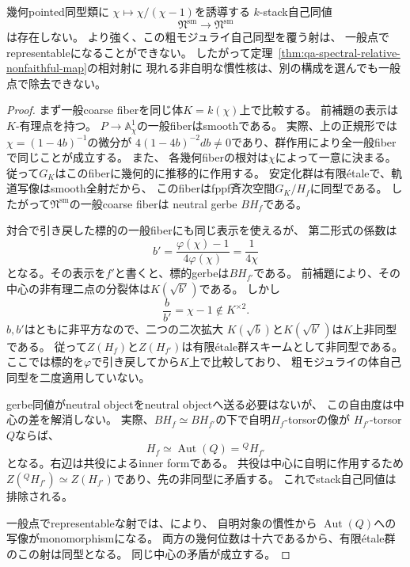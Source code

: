 \begin{theorem}
\label{thm:qa-spectral-no-stack-autoequivalence}
幾何pointed同型類に
$\chi\mapsto\chi/(\chi-1)$を誘導する
$k$-stack自己同値
\[
 \mathfrak N^{\mathrm{sm}}\longrightarrow\mathfrak N^{\mathrm{sm}}
\]
は存在しない。
より強く、この粗モジュライ自己同型を覆う射は、
一般点でrepresentableになることができない。
したがって定理~\ref{thm:qa-spectral-relative-nonfaithful-map}の相対射に
現れる非自明な慣性核は、別の構成を選んでも一般点で除去できない。
\end{theorem}
\begin{proof}
まず一般coarse fiberを同じ体$K=k(\chi)$上で比較する。
前補題の表示は$K$-有理点を持つ。
$P\to\mathbb A^1_\chi$の一般fiberはsmoothである。
実際、上の正規形では$\chi=(1-4b)^{-1}$の微分が
$4(1-4b)^{-2}db\ne0$であり、群作用により全一般fiberで同じことが成立する。
また、
各幾何fiberの根対は$\chi$によって一意に決まる。
従って$G_K$はこのfiberに幾何的に推移的に作用する。
安定化群は有限\'{e}taleで、軌道写像はsmooth全射だから、
このfiberはfppf斉次空間$G_K/H_f$に同型である。
したがって$\mathfrak N^{\mathrm{sm}}$の一般coarse fiberは
neutral gerbe $BH_f$である。

対合で引き戻した標的の一般fiberにも同じ表示を使えるが、
第二形式の係数は
\[
 b'=\frac{\varphi(\chi)-1}{4\varphi(\chi)}
 =\frac1{4\chi}
\]
となる。その表示を$f'$と書くと、標的gerbeは$BH_{f'}$である。
前補題により、その中心の非有理二点の分裂体は$K(\sqrt{b'})$である。
しかし
\[
 \frac b{b'}=\chi-1\notin K^{\times2}.
\]
$b,b'$はともに非平方なので、二つの二次拡大
$K(\sqrt b)$と$K(\sqrt{b'})$は$K$上非同型である。
従って$Z(H_f)$と$Z(H_{f'})$は有限\'{e}tale群スキームとして非同型である。
ここでは標的を$\varphi$で引き戻してから$K$上で比較しており、
粗モジュライの体自己同型を二度適用していない。

gerbe同値がneutral objectをneutral objectへ送る必要はないが、
この自由度は中心の差を解消しない。
実際、$BH_f\simeq BH_{f'}$の下で自明$H_f$-torsorの像が
$H_{f'}$-torsor $Q$ならば、
\[
 H_f\simeq\operatorname{Aut}(Q)={}^{Q}H_{f'}
\]
となる。右辺は共役によるinner formである。
共役は中心に自明に作用するため
$Z({}^{Q}H_{f'})\simeq Z(H_{f'})$であり、先の非同型に矛盾する。
これでstack自己同値は排除される。

一般点でrepresentableな射では、\cite[Tag~04YY]{StacksModuli}により、
自明対象の慣性から
$\operatorname{Aut}(Q)$への写像がmonomorphismになる。
両方の幾何位数は十六であるから、有限\'{e}tale群のこの射は同型となる。
同じ中心の矛盾が成立する。
\end{proof}

